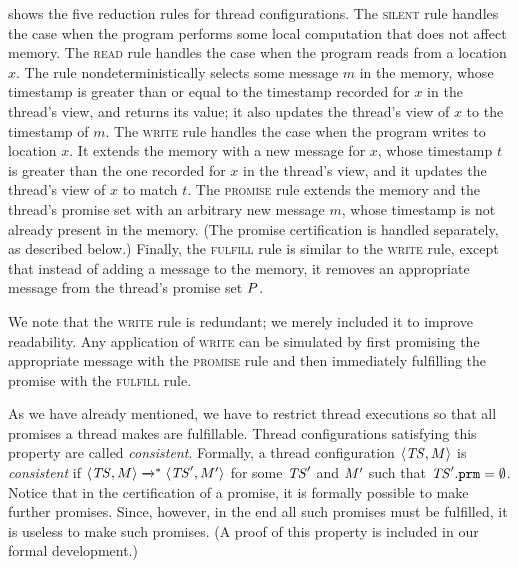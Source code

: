  shows the five reduction rules for thread
configurations.  The \textsc{silent} rule handles the case when the
program performs some local computation that does not affect memory.
The \textsc{read} rule handles the case when the program reads from a
location $x$.  The rule nondeterministically selects some message $m$
in the memory, whose timestamp is greater than or equal to the timestamp recorded
for $x$ in the thread's view, and returns its value; it also updates
the thread's view of $x$ to the timestamp of $m$.  The \textsc{write}
rule handles the case when the program writes to location $x$.  It
extends the memory with a new message for $x$, whose timestamp
$t$ is greater than the one recorded for $x$ in the thread's view, and
it updates the thread's view of $x$ to match $t$.  The
\textsc{promise} rule extends the memory and the thread's promise set
with an arbitrary new message $m$, whose timestamp is not already
present in the memory.  (The promise certification is handled
separately, as described below.)  Finally, the \textsc{fulfill} rule
is similar to the \textsc{write} rule, except that instead of
adding a message to the memory, it removes an appropriate message from
the thread's promise set $P$.

We note that the \textsc{write} rule is redundant; we merely included it
to improve readability.  Any application
of \textsc{write} can be simulated by first promising the appropriate
message with the \textsc{promise} rule and then immediately fulfilling
the promise with the \textsc{fulfill} rule.


As we have already mentioned, we have to restrict thread executions so
that all promises a thread makes are fulfillable.  Thread
configurations satisfying this property are called \emph{consistent}.
Formally, a thread configuration ${\langle{\mathit{TS},M}\rangle}$ is \emph{consistent} 
if ${\langle{\mathit{TS},M}\rangle} \xrightarrow{}^* {\langle{\mathit{TS}',M'}\rangle}$
for some $\mathit{TS}'$ and $M'$ such that $\mathit{TS}'.\texttt{prm} = \emptyset$.
Notice that in the certification of a promise, it is formally possible
to make further promises.  Since, however, in the end all such
promises must be fulfilled, it is useless to make such promises.
(A proof of this property is included in our formal development.)

